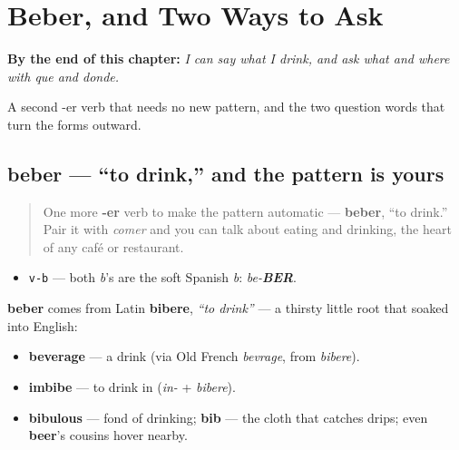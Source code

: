 
\chapter{Beber, and Two Ways to Ask}
\label{ch:spanish-beber-preguntas}

\begin{chapteropening}
\textbf{By the end of this chapter:} \emph{I can say what I drink, and ask what and where with que and donde.}

A second -er verb that needs no new pattern, and the two question words that turn the forms outward.
\end{chapteropening}

\section[beber]{beber — \textquotedblleft{}to drink,\textquotedblright{} and the pattern is yours}

\label{lesson:ES-C07-beber}



\begin{quote}
One more \textbf{-er} verb to make the pattern automatic — \textbf{beber}, \textquotedblleft{}to drink.\textquotedblright{} Pair it with \emph{comer} and you can talk about eating and drinking, the heart of any café or restaurant.
\end{quote}

\begin{sounds}
\begin{itemize}
\raggedright
  \item \texttt{v-b} — both \emph{b}'s are the soft Spanish \emph{b}: \emph{be-\textbf{BER}}.
\end{itemize}
\end{sounds}

\begin{cousinweb}
\textbf{beber} comes from Latin \textbf{bibere}, \emph{\textquotedblleft{}to drink\textquotedblright{}} — a thirsty little root that soaked into English:

\begin{itemize}
\raggedright
  \item \textbf{beverage} — a drink (via Old French \emph{bevrage}, from \emph{bibere}).
  \item \textbf{imbibe} — to drink in (\emph{in-} + \emph{bibere}).
  \item \textbf{bibulous} — fond of drinking; \textbf{bib} — the cloth that catches drips; even \textbf{beer}'s cousins hover nearby.
\end{itemize}
\end{cousinweb}

